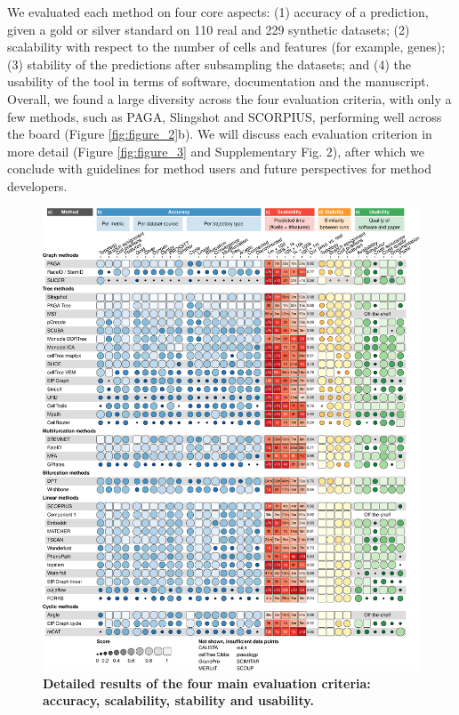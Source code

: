 We evaluated each method on four core aspects: (1) accuracy of a prediction, given a gold or silver standard on 110 real and 229 synthetic datasets; (2) scalability with respect to the number of cells and features (for example, genes); (3) stability of the predictions after subsampling the datasets; and (4) the usability of the tool in terms of software, documentation and the manuscript. Overall, we found a large diversity across the four evaluation criteria, with only a few methods, such as PAGA, Slingshot and SCORPIUS, performing well across the board (Figure \ref{fig:figure_2}b). We will discuss each evaluation criterion in more detail (Figure \ref{fig:figure_3} and Supplementary Fig. 2), after which we conclude with guidelines for method users and future perspectives for method developers.

\begin{figure}
	\centering\includegraphics[width=\linewidth]{fig/dynbenchmark/figure_3.pdf}
	\caption{	
		\textbf{Detailed results of the four main evaluation criteria: accuracy, scalability, stability and usability.}
}
\end{figure}
